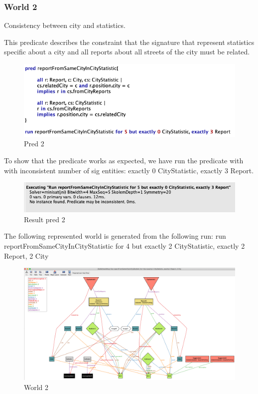 \subsubsection{World 2}
Consistency between city and statistics.

This predicate describes the constraint that the signature that represent statistics specific about a city and all reports about all streets of the city must be related.
\begin{figure}[h]
	\centering
	\includegraphics[width=0.9\linewidth, height=0.15\textheight]{Images/Alloy/test-world21}
	\caption{Pred 2}
	\label{Pred 2}
\end{figure}
\FloatBarrier
To show that the predicate works as expected, we have run the predicate with with inconsistent number of sig entities: exactly 0 CityStatistic, exactly 3 Report.
\begin{figure}[h]
	\centering
	\includegraphics[width=0.9\linewidth, height=0.11\textheight]{Images/Alloy/test-world22}
	\caption{Result pred 2}
	\label{Result pred 2}
\end{figure}
\FloatBarrier
\newpage
The following represented world is generated from the following run: run reportFromSameCityInCityStatistic for 4 but exactly 2 CityStatistic, exactly 2 Report, 2 City
\begin{figure}[h]
	\centering
	\includegraphics[width=1\linewidth, height=0.47\textheight]{Images/Alloy/world2}
	\caption{World 2}
	\label{World2}
\end{figure}
\FloatBarrier
\newpage
